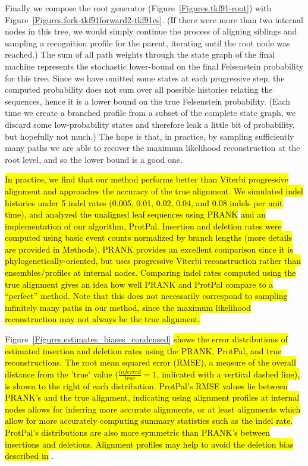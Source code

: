 \documentclass{article}
\newcommand{\figref}[1]{Figure~\ref{Figures.#1}}
\newcommand{\needfig}[1]{{\bf Need figure: } #1 }
\begin{document}

Finally we compose the root generator (\figref{tkf91-root})
with \figref{fork-tkf91forward2-tkf91cs}.
(If there were more than two internal nodes in this tree,
we would simply continue the process of aligning siblings and sampling a recognition profile for the parent,
iterating until the root node was reached.)
The sum of all path weights through the state graph of the final machine
 represents the stochastic lower-bound
on the final Felsenstein probability for this tree.
Since we have omitted some states at each progressive step,
the computed probability does not sum over all possible histories
relating the sequences, hence it is a lower bound on the true Felsenstein probability.
(Each time we create a branched profile from a subset of the complete state graph,
we discard some low-probability states and therefore leak a little bit of probability, but hopefully not much.)
The hope is that, in practice, by sampling sufficiently many paths we are able to 
recover the maximum likelihood reconstruction at the root level, and so the
lower bound is a good one.

\hl{
In practice, we find that our method performs better than Viterbi progressive alignment and 
approaches the accuracy of the true alignment. 
We simulated indel histories under 5 indel rates
 (0.005, 0.01, 0.02, 0.04, and 0.08 indels per unit time), and analyzed the unaligned leaf
sequences using PRANK} \cite{LoytynojaGoldman2008} 
\hl{ and an implementation of our algorithm, ProtPal.  
Insertion and deletion rates were computed using basic event counts normalized by branch lengths 
(more details are provided in Methods). 
PRANK provides an excellent comparison since it is phylogenetically-oriented, but
 uses progressive Viterbi reconstruction rather than  ensembles/profiles at internal nodes. 
Comparing indel rates computed using  the true alignment gives
 an idea how well PRANK and ProtPal compare to a  ``perfect''
method.  Note that this does not necessarily correspond to sampling
 infinitely many paths in our method, 
since the maximum likelihood reconstruction may not always be the true alignment.  }

\figref{estimates_biases_condensed} \hl{shows the error distributions 
of estimated insertion and deletion
rates using the PRANK, ProtPal, and true reconstructions.  The root mean squared error (RMSE),  
a measure of the overall distance from the 'true' value ($\frac{inferred}{true} = 1$, indicated
with a vertical dashed line), is shown 
to the right of each distribution.  
ProtPal's RMSE values lie between  PRANK's and the true alignment, indicating using alignment
profiles at internal nodes allows for inferring more accurate alignments, or at least alignments
which allow for more accurately computing summary statistics such as the indel rate.  
ProtPal's distributions are also more symmetric than PRANK's between insertions and deletions. 
Alignment profiles  may help to avoid the deletion bias described in} \cite{LoytynojaGoldman2008}. 
\end{document}
